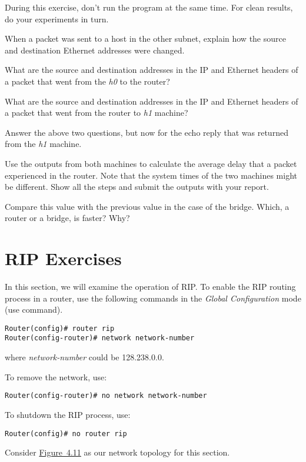 \documentclass{../UTNetLab}
\begin{document}
    During this exercise, don’t run the  program at the same time.
    For clean results, do your experiments in turn.
    
    \begin{report}
        \item When a packet was sent to a host in the other subnet, explain how the source and destination Ethernet addresses were changed.
        
        \item What are the source and destination addresses in the IP and Ethernet headers of a packet that went from the \textit{h0} to the router?
        
        \item What are the source and destination addresses in the IP and Ethernet headers of a packet that went from the router to \textit{h1} machine?
        
        \item Answer the above two questions, but now for the echo reply that was returned from the \textit{h1} machine.

        \item Use the  outputs from both machines to calculate the average delay that a packet experienced in the router.
                Note that the system times of the two machines might be different.
                Show all the steps and submit the  outputs with your report.
        
        \item Compare this value with the previous value in the case of the bridge.
                Which, a router or a bridge, is faster? Why?
    \end{report}

\part{RIP Exercises}\label{sec:rip}
    In this section, we will examine the operation of RIP.
    To enable the RIP routing process in a router, use the following commands in the \textit{Global Configuration} mode (use  command).
    \begin{lstlisting}[language={cisco}, emph={network-number}]
Router(config)# router rip
Router(config-router)# network network-number
    \end{lstlisting}
    where \textit{network-number} could be 128.238.0.0.
    
    To remove the network, use:
    \begin{lstlisting}[language={cisco}, emph={network-number}]
Router(config-router)# no network network-number
    \end{lstlisting}
    To shutdown the RIP process, use:
    \begin{lstlisting}[language={cisco}]
Router(config)# no router rip
    \end{lstlisting}
    Consider \hyperref[fig:4.11]{Figure~4.11} as our network topology for this section.
\end{document}
